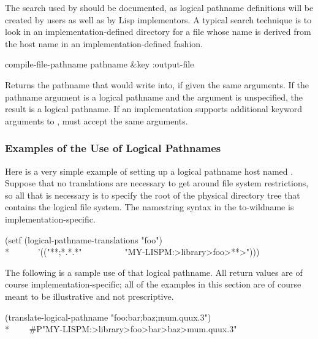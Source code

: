 \begin{newer}
\begin{defun}[Function]
    The search used by  should be
    documented, as logical pathname definitions will be created by users as well as
    by Lisp implementors.  A typical search technique is to
    look in an implementation-defined directory for a file whose name is derived from
    the host name in an implementation-defined fashion.
\end{defun}

\begin{defun}[Function]
compile-file-pathname pathname &key :output-file           

    Returns the pathname that  would write into, if given the
    same arguments.  If the pathname argument is a logical pathname and the
     argument is unspecified, the result is a logical pathname.
    If an implementation supports additional keyword arguments to
    ,  must accept the same arguments.
\end{defun}

\subsubsection{Examples of the Use of Logical Pathnames}

  Here is a very simple example of setting up a logical pathname host named .
  Suppose that no
  translations are necessary to get around file system restrictions, so
  all that is necessary is to specify the root of the physical directory
  tree that contains the logical file system.
 The namestring syntax in the to-wildname is implementation-specific.
\begin{lisp}
(setf (logical-pathname-translations "foo") \\*
~~~~~~'(("**;*.*.*"~~~~~~~~~~"MY-LISPM:>library>foo>**>")))
\end{lisp}
The following is a sample use of that logical pathname.  All return values
are of course implementation-specific; all of the examples in this section
are of course meant to be illustrative and not prescriptive.
\begin{lisp}
(translate-logical-pathname "foo:bar;baz;mum.quux.3") \\*
~~~\EV\ \#P"MY-LISPM:>library>foo>bar>baz>mum.quux.3"
\end{lisp}


\end{newer}
